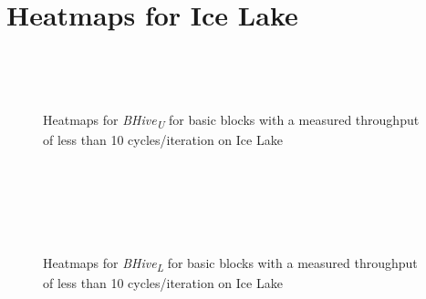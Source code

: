 \documentclass[sigconf,nonacm]{acmart}
\newcommand{\bhivel}{\emph{BHive\textsubscript{L}}\xspace}
\newcommand{\bhiveu}{\emph{BHive\textsubscript{U}}\xspace}
\begin{document}
\section{Heatmaps for Ice Lake}
\vfill
\begin{figure}[H]
\centering
\begin{subfigure}[t]{0.33\textwidth}\end{subfigure}~
\begin{subfigure}[t]{0.33\textwidth}\end{subfigure}~
\begin{subfigure}[t]{0.33\textwidth}\end{subfigure}\par\bigskip

\begin{subfigure}[t]{0.33\textwidth}\end{subfigure}
\caption{Heatmaps for \bhiveu for basic blocks with a measured throughput of less than 10 cycles/iteration on Ice Lake}
\end{figure}
\vfill

\newpage
\vfill
\begin{figure}[H]
\centering
\begin{subfigure}[t]{0.33\textwidth}\end{subfigure}~
\begin{subfigure}[t]{0.33\textwidth}\end{subfigure}~
\begin{subfigure}[t]{0.33\textwidth}\end{subfigure}\par\bigskip

\begin{subfigure}[t]{0.33\textwidth}\end{subfigure}~
\begin{subfigure}[t]{0.33\textwidth}\end{subfigure}
\caption{Heatmaps for \bhivel for basic blocks with a measured throughput of less than 10 cycles/iteration on Ice Lake}
\end{figure}
\vfill
\end{document}
